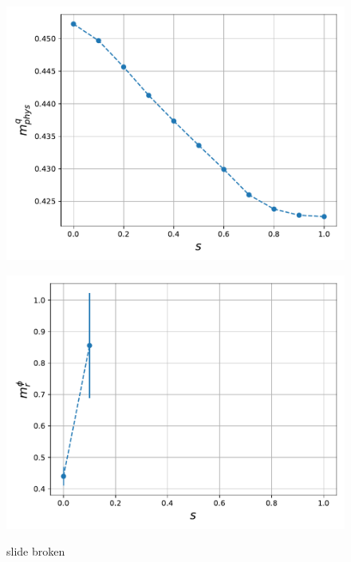 \begin{figure}
\begin{minipage}{0.45\textwidth}
        \label{fig:slide_broken_cond}
    \end{minipage}
 \begin{minipage}{0.45\textwidth}
    \includegraphics[scale=0.52]{figures/slide_broken/mqphys.pdf}
    \label{fig:slide_broken_mqphys}
\end{minipage}
\hfill
\begin{minipage}{0.45\textwidth}
    \includegraphics[scale=0.52]{figures/slide_broken/mphir.pdf}
    \label{fig:slide_broken_mphir}
\end{minipage}
\caption{slide broken}
\label{fig:slide_broken}
\end{figure}


